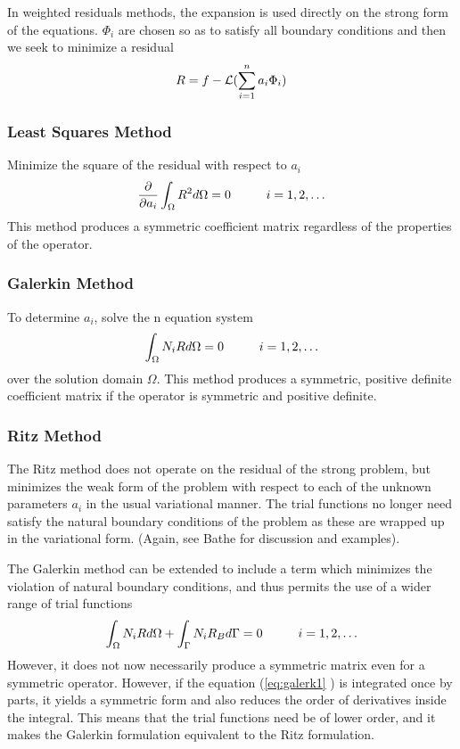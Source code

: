 \documentclass[10pt]{article}
\newcommand{\Emerald }[1]{\textcolor[rgb]{0.0,0.7,0.3}{ #1}}
\begin{document}
	In weighted residuals methods, the expansion is used directly
	on the strong form of the equations. $\Phi_i$ are chosen so
	as to satisfy all boundary conditions and then we seek to 
	minimize a residual
		\begin{equation}
			R = f - {\cal{L}}( \sum_{i=1}^{n} a_i \Phi_i	)
		\end{equation}		
		 	
	\subsubsection{Least Squares Method}	 	
	 Minimize the square of the residual with respect to $a_i$
	 	\begin{equation}
	 		\frac{\partial}{\partial a_i} \int_\Omega R^2 d\Omega = 0   \mbox{\hspace{1cm}} i = 1,2,\ldots
	 	\end{equation}
	 This method produces a symmetric coefficient matrix regardless of the
	 properties of the operator.	
	 	
	\subsubsection{Galerkin Method}
	To determine $a_i$, solve the n equation system
		\begin{equation}
			\int_\Omega N_i R d\Omega = 0	 \mbox{\hspace{1cm}} i = 1,2,\ldots
		\end{equation}		
	over the solution domain $\Omega$. This method produces a 
	symmetric, positive definite coefficient matrix if the operator is 
	symmetric and positive definite.
		 	
	\subsubsection{Ritz Method}	 	
	The Ritz method does not operate on the residual of the strong problem,
	but minimizes the weak form of the problem with respect to each of the
	unknown parameters $a_i$ in the usual variational manner. The trial 
	functions no longer need satisfy the natural boundary conditions
	of the problem as these are wrapped up in the variational form.
	\Emerald{(Again, see Bathe for discussion and examples).	 	}
		 	
	The Galerkin method can be extended to include a term which 
	minimizes the violation of natural boundary conditions, and thus
	permits the use of a wider range of trial functions	 	
		 \begin{equation}
			\int_\Omega N_i R d\Omega  + \int_\Gamma N_i R_B d\Gamma = 0	 \mbox{\hspace{1cm}} i = 1,2,\ldots
			\label{eq:galerk1}
		\end{equation}		
	However, it does not now necessarily produce a symmetric matrix even
	for a symmetric operator. However, if the equation (\ref{eq:galerk1} ) is
	integrated once by parts, it yields a symmetric form and also reduces
	the order of derivatives inside the integral. This means that 
	the trial functions need be of lower order, and it makes the
	Galerkin formulation equivalent to the Ritz formulation.
		
\end{document}
